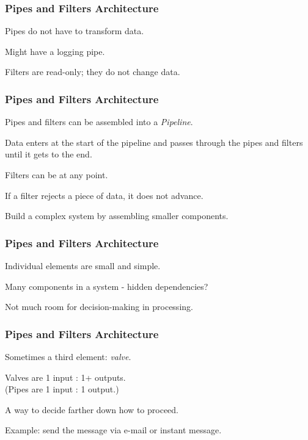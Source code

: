 \begin{frame}
\frametitle{Pipes and Filters Architecture}

\begin{changemargin}{1cm}
Pipes do not have to transform data.

Might have a logging pipe.

Filters are read-only; they do not change data.

\end{changemargin}
\end{frame}

\begin{frame}
\frametitle{Pipes and Filters Architecture}

\begin{changemargin}{1cm}
Pipes and filters can be assembled into a \emph{Pipeline}.

Data enters at the start of the pipeline and passes through the pipes and filters until it gets to the end.

Filters can be at any point.

If a filter rejects a piece of data, it does not advance.

Build a complex system by assembling smaller components.


\end{changemargin}
\end{frame}

\begin{frame}
\frametitle{Pipes and Filters Architecture}

\begin{changemargin}{1cm}
Individual elements are small and simple.

Many components in a system - hidden dependencies?

Not much room for decision-making in processing.

\end{changemargin}
\end{frame}

\begin{frame}
\frametitle{Pipes and Filters Architecture}

\begin{changemargin}{1cm}
Sometimes a third element: \emph{valve}.

Valves are 1 input : 1+ outputs.\\
\quad (Pipes are 1 input : 1 output.)

A way to decide farther down how to proceed.

Example: send the message via e-mail or instant message.

\end{changemargin}
\end{frame}

